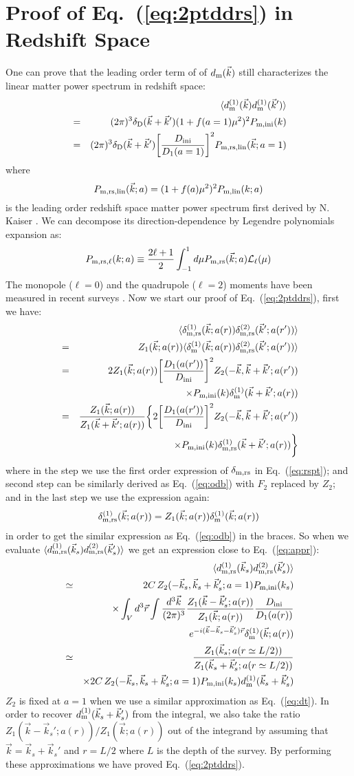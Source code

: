 \documentclass[prd,amsmath,amssymb,floatfix,superscriptaddress,nofootinbib,twocolumn]{revtex4-1}
\def\be{\begin{equation}}
\def\ee{\end{equation}}
\def\bea{\begin{eqnarray}}
\def\eea{\end{eqnarray}}
\newcommand{\rs}{\rm rs}
\newcommand{\ini}{\rm ini}
\newcommand{\vrr}{\vec{r}}
\newcommand{\vs}{\nonumber\\}
\newcommand{\vk}{\vec{k}}
\newcommand{\ec}[1]{Eq.~(\ref{eq:#1})}
\newcommand{\eql}[1]{\label{eq:#1}}
\begin{document}
\section{Proof of \ec{2ptddrs} in Redshift Space} \label{appenda}
One can prove that the leading order term of of $d_{\rm m}(\vk)$ still characterizes the linear matter power spectrum in redshift space:
\bea 
&&\langle d^{( 1)}_{\rm m}(\vk) d^{(1)}_{\rm m}(\vk') \rangle\vs
& = &(2\pi)^3 \delta_{\rm D}(\vk+\vk')(1+f(a=1)\mu^2)^2 P_{\rm m,ini}(k)\vs
&= &(2\pi)^3 \delta_{\rm D}(\vk+\vk')\bigg[ \frac{D_{\ini}}{D_1(a=1)}\bigg]^2 P_{\rm m,rs,lin}(\vk;a=1)\vs \eql{lpsrs}
\eea 
where 
\be 
P_{\rm m,rs,lin}(\vk;a)=(1+f(a)\mu^2)^2 P_{\rm m,lin}(k;a) \eql{kaiser}
\ee 
is the leading order redshift space matter power spectrum first derived by N. Kaiser \cite{Kaiser:1987rsd}. We can decompose its direction-dependence by Legendre polynomials expansion as:
\be 
P_{\rm m,rs,\ell}(k;a)\equiv \frac{2\ell+1}{2}\int_{-1}^{1}d\mu P_{\rm m,rs}(\vk;a) \mathcal{L}_{\ell}(\mu)
\ee 
The monopole ($\ell=0$) and the quadrupole ($\ell=2$) moments have been measured in recent surveys \cite{Gil-Marin:2015sqa}. Now we start our proof of \ec{2ptddrs}, first we have:
\bea 
&&\langle \delta_{\rm m,\rs}^{(1)}(\vk;a(r))\delta_{\rm m,\rs}^{(2)}(\vk';a(r'))\rangle\vs 
&=&Z_{1}(\vk;a(r))\langle \delta_{\rm m}^{(1)}(\vk;a(r))\delta_{\rm m,\rs}^{(2)}(\vk';a(r'))\rangle\vs 
&=&2Z_{1}(\vk;a(r))\bigg[\frac{D_{1}(a(r'))}{D_{\ini}} \bigg]^{2}Z_{2}(-\vk,\vk+\vk';a(r'))\vs
&& \times P_{\rm m,\ini}(k)\delta_{\rm m}^{(1)}(\vk+\vk';a(r))\vs 
&=&\frac{Z_{1}(\vk;a(r))}{Z_{1}(\vk+\vk';a(r))}\bigg\{2\bigg[\frac{D_{1}(a(r'))}{D_{\ini}} \bigg]^{2}Z_{2}(-\vk,\vk+\vk';a(r')) \vs
&& \times P_{\rm m,\ini}(k)\delta_{\rm m,\rs}^{(1)}(\vk+\vk';a(r))\bigg\}
\eea 
where in the step we use the first order expression of $\delta_{\rm m, \rs}$ in \ec{rspt}; and second step can be similarly derived as \ec{odb} with $F_2$ replaced by $Z_2$; and in the last step we use the expression again:
\be 
\delta_{\rm m,\rs}^{(1)}(\vk;a(r))=Z_{1}(\vk;a(r))\delta_{\rm m}^{(1)}(\vk;a(r))
\ee 
in order to get the similar expression as \ec{odb} in the braces. So when we evaluate $\langle d_{\rm m,\rs}^{(1)}(\vk_s) d_{\rm m,\rs}^{(2)}(\vk'_s)\rangle$ we get an expression close to \ec{appr}:
\bea 
&& \langle d^{(1)}_{\rm m,\rs}(\vk_s)d^{(2)}_{\rm m,\rs}(\vk_s') \rangle \vs 
&\simeq & 2C\,Z_{2}(-\vk_s,\vk_s+\vk_s';a=1)P_{\rm m,\ini}(k_s) \vs
&& \times \int_{V} d^{3} \vrr\int \frac{d^{3}\vk}{(2\pi)^3}\frac{Z_{1}(\vk-\vk_s';a(r))}{Z_{1}(\vk;a(r))}\frac{D_{\ini}}{D_{1}(a(r))}\vs
&&\qquad e^{-i(\vk-\vk_s-\vk_s')\vrr}\delta_{\rm m}^{(1)}(\vk;a(r))\vs
&\simeq & \frac{Z_{1}(\vk_s;a(r\simeq L/2 ) )}{Z_{1}(\vk_s+\vk_s';a(r\simeq L/2 ))} \vs 
&&\times2C\,Z_{2}(-\vk_s,\vk_s+\vk_s';a=1) P_{\rm m,\ini}(k_s)d_{\rm m}^{(1)}(\vk_s+\vk_s') \vs\eql{apprrs}
\eea 
$Z_2$ is fixed at $a=1$ when we use a similar approximation as \ec{dt}. In order to recover $d_{\rm m}^{(1)}(\vk_s+\vk_s')$ from the integral, we also take the ratio ${Z_{1}(\vk-\vk_s';a(r))}/{Z_{1}(\vk;a(r))}$ out of the integrand by assuming that $\vk=\vk_s+\vk_s'$ and $r=L/2$ where $L$ is the depth of the survey. By performing these approximations we have proved \ec{2ptddrs}.
\end{document}
